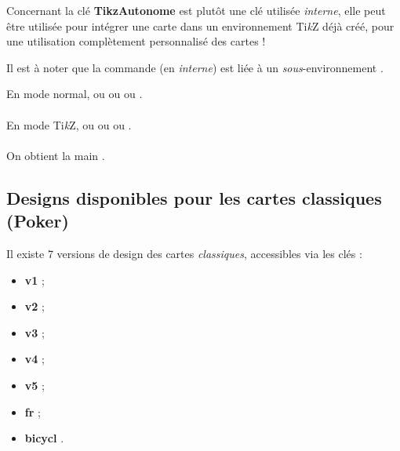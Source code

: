 \documentclass[a4paper]{article}
\providecommand\tikzlogo{Ti\textit{k}Z}
\let\TikZ\tikzlogo
\newcommand\ctex[1]{\tcbox[vignettelatex]{#1}\xspace}
\newcommand\cmaj[1]{\tcbox[vignetteMaJ]{#1}\xspace}
\newcommand\Cle[1]{{\bfseries\sffamily\textlangle #1\textrangle}}
\begin{document}
\begin{codeinfo}
Concernant la clé \Cle{TikzAutonome} est plutôt une clé utilisée \textit{interne}, elle peut être utilisée pour intégrer une carte dans un environnement \TikZ{} déjà créé, pour une utilisation complètement personnalisé des cartes !

\smallskip

Il est à noter que la commande (en \textit{interne}) est liée à un \textit{sous}-environnement \ctex{scope}.
\end{codeinfo}

\begin{codetex}[]
En mode normal,  ou  ou
 ou .\\ \\
En mode \TikZ, 
ou 
ou 
ou .\\ \\
On obtient la main .
\end{codetex}

\pagebreak

\subsection{Designs disponibles pour les cartes classiques (Poker)}

\begin{codeinfo}
Il existe 7 versions de design des cartes \textit{classiques}, accessibles via les clés :
\vspace*{-0.75\baselineskip}
\begin{multicols}{4}
\begin{itemize}
	\item \Cle{v1} ;
	\item \Cle{v2} ;
	\item \Cle{v3} ;
	\item \Cle{v4} ;
	\item \Cle{v5} ;
	\item \Cle{fr} \cmaj{0.2.4} ;
	\item \Cle{bicycl} \cmaj{0.2.4}.
\end{itemize}
\end{multicols}
\end{codeinfo}
\end{document}
